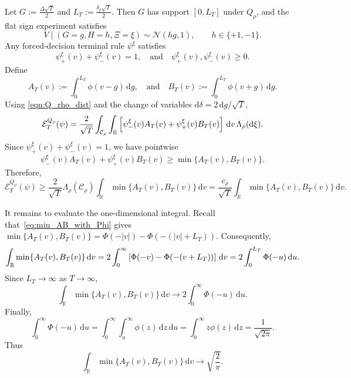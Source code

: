 \documentclass[10pt]{article}
\newcommand{\dd}{\mathrm{d}}
\theoremstyle{plain}
\begin{document}
Let $G:=\frac{\Delta\sqrt T}{2}$ and $L_T:=\frac{\delta_\rho\sqrt T}{2}$.
Then $G$ has support $[0,L_T]$ under $Q_\rho$, and the flat sign experiment satisfies
\[
    V\mid(G=g,H=h,\Xi=\xi)\sim \mathcal N(hg,1),
    \qquad h\in\{+1,-1\}.
\]
Any forced-decision terminal rule $\psi^\xi$ satisfies
\[
    \psi_+^\xi(v)+\psi_-^\xi(v)=1,
    \quad\mbox{and}\quad
    \psi_+^\xi(v),\psi_-^\xi(v)\ge0 .
\]
Define
\[
    A_T(v)
    :=
    \int_0^{L_T}\phi(v-g)\,\dd g,
    \quad\mbox{and}\quad
    B_T(v)
    :=
    \int_0^{L_T}\phi(v+g)\,\dd g .
\]
Using \eqref{eqn:Q_rho_dist} and the change of variables
$\dd\delta=2\,\dd g/\sqrt T$, 
$$
    \mathcal E_T^{Q_\rho}(\psi)
    =
    \frac{2}{\sqrt T}
    \int_{\mathcal{C}_\rho}\int_{\mathbb R}
    \left[
        \psi_-^\xi(v)A_T(v)
        +
        \psi_+^\xi(v)B_T(v)
    \right]\,\dd v\,\Lambda_\rho(\dd\xi).\notag
$$
Since $\psi_+^\xi(v)+\psi_-^\xi(v)=1$, we have pointwise
\[
    \psi_-^\xi(v)A_T(v)
    +
    \psi_+^\xi(v)B_T(v)
    \ge
    \min\{A_T(v),B_T(v)\}.
\]
Therefore,
\begin{equation}
\label{eq:no-abstention-min-lower}
    \mathcal E_T^{Q_\rho}(\psi)
    \ge
    \frac{2}{\sqrt T}
    \Lambda_\rho(\mathcal{C}_\rho)
    \int_{\mathbb R}\min\{A_T(v),B_T(v)\}\,\dd v
    =
    \frac{c_\rho}{\sqrt T}
    \int_{\mathbb R}\min\{A_T(v),B_T(v)\}\,\dd v .
\end{equation}

It remains to evaluate the one-dimensional integral. Recall  that~\eqref{eq:min_AB_with_Phi} gives
    $\min\{A_T(v),B_T(v)\}
    =
    \Phi(-|v|)
    -
    \Phi(-(|v|+L_T))$.
Consequently,
$$    \int_{\mathbb R}\min\{A_T(v),B_T(v)\}\,\dd v
    =
    2\int_0^\infty
    \left[
        \Phi(-v)-\Phi(-(v+L_T))
    \right]\,\dd v  \notag
    =
    2\int_0^{L_T} \Phi(-u)\,\dd u .
$$
Since $L_T\to\infty$ as $T\to\infty$,
\[
    \int_{\mathbb R}\min\{A_T(v),B_T(v)\}\,\dd v
    \to
    2\int_0^\infty \Phi(-u)\,\dd u .
\]
Finally,
\[
    \int_0^\infty \Phi(-u)\,\dd u
    =
    \int_0^\infty\int_u^\infty \phi(z)\,\dd z\,\dd u
    =
    \int_0^\infty z\phi(z)\,\dd z
    =
    \frac{1}{\sqrt{2\pi}}.
\]
Thus
\begin{equation}
\label{eq:no-abstention-integral-limit}
    \int_{\mathbb R}\min\{A_T(v),B_T(v)\}\,\dd v
    \to
    \sqrt{\frac{2}{\pi}} .
\end{equation}
\end{document}
